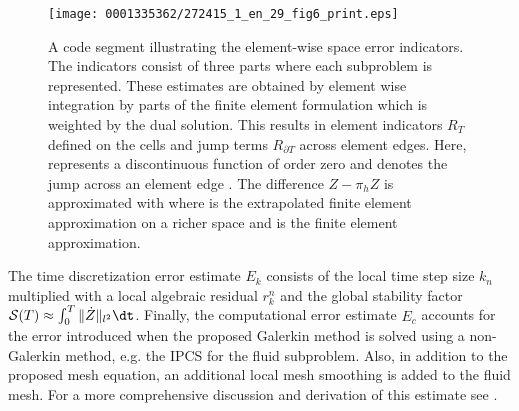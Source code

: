 \begin{figure}[!t]
\texttt{[image: 0001335362/272415\_1\_en\_29\_fig6\_print.eps]}
\caption{A code segment illustrating the element-wise space error
  indicators. The indicators consist of three parts where each
  subproblem is represented. These estimates are obtained by element
  wise integration by parts of the finite element formulation which is
  weighted by the dual solution. This results in element indicators
  $R_T$ defined on the cells and jump terms $R_{\partial T}$ across
  element edges. Here,  represents a discontinuous function of
  order zero and  denotes the jump across an element edge
  . The difference $Z -\pi_h Z$ is approximated with  where  is the extrapolated finite element approximation
  on a richer space and  is the finite element approximation.}
\label{selim:fig:strong_residuals}
\end{figure}
The time discretization error estimate $E_k$ consists of the local time
step size $k_n$ multiplied with a local algebraic residual
$r_k^n$ and the global stability factor $\mathcal{S}(T) \approx
\int_0^T \| \dot{Z} \|_{l^2}\dt$. Finally, the computational error
estimate $E_c$ accounts for the error introduced when the proposed
Galerkin method is solved using a non-Galerkin method, e.g. the IPCS
for the fluid subproblem. Also, in addition to the proposed mesh
equation, an additional local mesh smoothing is added to the fluid
mesh.  For a more comprehensive discussion and derivation of this
\apost{} estimate see \citet{SelimLogg2011a}.

